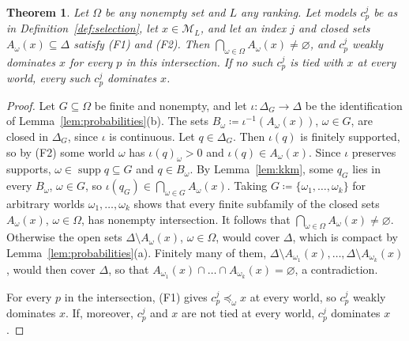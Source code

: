 \documentclass[11pt]{article}
\newtheorem{theorem}{Theorem}[section]
\theoremstyle{definition}
\theoremstyle{remark}
\newcommand{\M}{\mathcal M}
\newcommand{\supp}{\operatorname{supp}}
\begin{document}
\begin{theorem}\label{thm:general}
Let $\Omega$ be any nonempty set and $L$ any ranking. Let models $c^j_p$ be as in Definition~\ref{def:selection}, let $x\in\M_L$, and let an index $j$ and closed sets $A_\omega(x)\subseteq\Delta$ satisfy (F1) and (F2). Then $\bigcap_{\omega\in\Omega}A_\omega(x)\ne\varnothing$, and $c^j_p$ weakly dominates $x$ for every $p$ in this intersection. If no such $c^j_p$ is tied with $x$ at every world, every such $c^j_p$ dominates $x$.
\end{theorem}
\begin{proof}
Let $G\subseteq\Omega$ be finite and nonempty, and let $\iota:\Delta_G\to\Delta$ be the identification of Lemma~\ref{lem:probabilities}(b). The sets $B_\omega\coloneqq\iota^{-1}(A_\omega(x))$, $\omega\in G$, are closed in $\Delta_G$, since $\iota$ is continuous. Let $q\in\Delta_G$. Then $\iota(q)$ is finitely supported, so by (F2) some world $\omega$ has $\iota(q)_\omega>0$ and $\iota(q)\in A_\omega(x)$. Since $\iota$ preserves supports, $\omega\in\supp q\subseteq G$ and $q\in B_\omega$. By Lemma~\ref{lem:kkm}, some $q_G$ lies in every $B_\omega$, $\omega\in G$, so $\iota(q_G)\in\bigcap_{\omega\in G}A_\omega(x)$. Taking $G\coloneqq\{\omega_1,\dots,\omega_k\}$ for arbitrary worlds $\omega_1,\dots,\omega_k$ shows that every finite subfamily of the closed sets $A_\omega(x)$, $\omega\in\Omega$, has nonempty intersection. It follows that $\bigcap_{\omega\in\Omega}A_\omega(x)\ne\varnothing$. Otherwise the open sets $\Delta\setminus A_\omega(x)$, $\omega\in\Omega$, would cover $\Delta$, which is compact by Lemma~\ref{lem:probabilities}(a). Finitely many of them, $\Delta\setminus A_{\omega_1}(x),\dots,\Delta\setminus A_{\omega_k}(x)$, would then cover $\Delta$, so that $A_{\omega_1}(x)\cap\dots\cap A_{\omega_k}(x)=\varnothing$, a contradiction.

For every $p$ in the intersection, (F1) gives $c^j_p\preceq_\omega x$ at every world, so $c^j_p$ weakly dominates $x$. If, moreover, $c^j_p$ and $x$ are not tied at every world, $c^j_p$ dominates $x$.
\end{proof}
\end{document}
